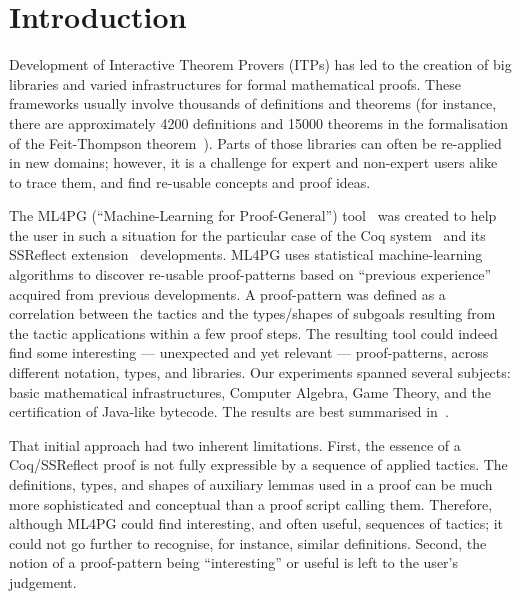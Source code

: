 \section{Introduction}\label{sec:introduction}


Development of Interactive Theorem Provers (ITPs) has led to the creation of big libraries and varied infrastructures for formal
mathematical proofs.
These frameworks usually involve thousands of definitions and theorems (for instance, there are approximately
4200 definitions and 15000 theorems in the formalisation of the Feit-Thompson theorem~\cite{FTT}).
Parts of  those libraries can often be re-applied in new domains; however,
it is a challenge for expert and non-expert users alike to trace them, and find re-usable concepts and proof ideas.

The ML4PG (``Machine-Learning for Proof-General'') tool~\cite{KHG13,CICM13,HK14} was created to help the user in such a situation for the particular case of the Coq system~\cite{Coq} and its SSReflect extension~\cite{SSReflect} developments. ML4PG uses statistical machine-learning algorithms to discover re-usable proof-patterns based on ``previous experience'' acquired from previous developments. A proof-pattern was defined as a correlation between the tactics and the types/shapes of subgoals resulting from the tactic applications within a few proof steps. The resulting tool could indeed find some interesting --- unexpected and yet relevant --- proof-patterns,
across different notation, types, and libraries. Our experiments spanned several subjects: basic mathematical infrastructures, Computer Algebra, Game Theory, and the certification of Java-like bytecode. The results are best summarised in~\cite{CICM13,HK14}.

That initial approach had two inherent limitations. First, the essence of a Coq/SSReflect proof is not fully expressible by a sequence of applied tactics. The definitions, types, and shapes of auxiliary lemmas used in a proof can be much more sophisticated and conceptual than a proof script calling them. Therefore, although ML4PG could find interesting, and often useful, sequences of tactics; it could not go further to recognise, for instance, similar definitions. Second, the notion of a proof-pattern being ``interesting'' or useful is left to the user's judgement.

